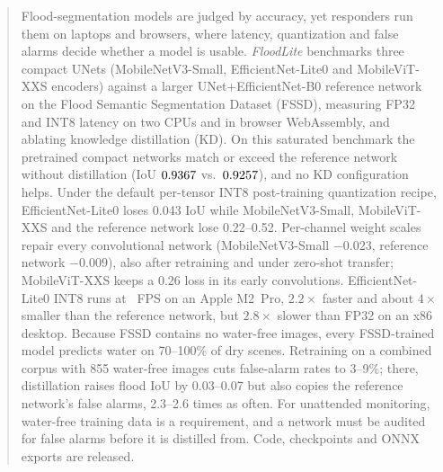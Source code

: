 
\begin{abstract}
Flood-segmentation models are judged by accuracy, yet responders run them on laptops and browsers, where latency, quantization and false alarms decide whether a model is usable. \emph{FloodLite} benchmarks three compact UNets (MobileNetV3-Small, EfficientNet-Lite0 and MobileViT-XXS encoders) against a larger UNet$+$EfficientNet-B0 reference network on the Flood Semantic Segmentation Dataset (FSSD), measuring FP32 and INT8 latency on two CPUs and in browser WebAssembly, and ablating knowledge distillation (KD). On this saturated benchmark the pretrained compact networks match or exceed the reference network without distillation (IoU $\bestStudentIoU$ vs.\ $\teacherIoU$), and no KD configuration helps. Under the default per-tensor INT8 post-training quantization recipe, EfficientNet-Lite0 loses 0.043 IoU while MobileNetV3-Small, MobileViT-XXS and the reference network lose 0.22--0.52. Per-channel weight scales repair every convolutional network (MobileNetV3-Small $-0.023$, reference network $-0.009$), also after retraining and under zero-shot transfer; MobileViT-XXS keeps a 0.26 loss in its early convolutions. EfficientNet-Lite0 INT8 runs at \deployableMTwoFPS~FPS on an Apple M2~Pro, $2.2\times$ faster and about $4\times$ smaller than the reference network, but $2.8\times$ slower than FP32 on an x86 desktop. Because FSSD contains no water-free images, every FSSD-trained model predicts water on 70--100\% of dry scenes. Retraining on a combined corpus with 855 water-free images cuts false-alarm rates to 3--9\%; there, distillation raises flood IoU by 0.03--0.07 but also copies the reference network's false alarms, 2.3--2.6 times as often. For unattended monitoring, water-free training data is a requirement, and a network must be audited for false alarms before it is distilled from. Code, checkpoints and ONNX exports are released.
\end{abstract}
